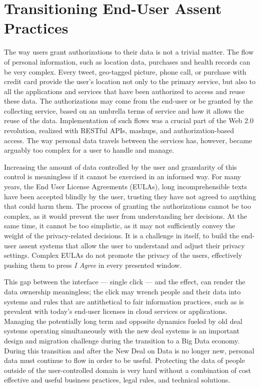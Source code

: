 \section{Transitioning End-User Assent Practices }

The way users grant authorizations to their data is not a trivial matter.
The flow of personal information, such as location data, purchases and health records can be very complex.
Every tweet, geo-tagged picture, phone call, or purchase with credit card provide the user's location not only to the primary service, but also to all the applications and services that have been authorized to access and reuse these data.
The authorizations may come from the end-user or be granted by the collecting service, based on an umbrella terms of service and how it allows the reuse of the data.
Implementation of such flows was a crucial part of the Web 2.0 revolution, realized with RESTful APIs, mashups, and authorization-based access.
The way personal data travels between the services has, however, became arguably too complex for a user to handle and manage.

Increasing the amount of data controlled by the user and granularity of this control is meaningless if it cannot be exercised in an informed way.
For many years, the End User License Agreements (EULAs), long incomprehensible texts have been accepted blindly by the user, trusting they have not agreed to anything that could harm them.
The process of granting the authorizations cannot be too complex, as it would prevent the user from understanding her decisions.
At the same time, it cannot be too simplistic, as it may not sufficiently convey the weight of the privacy-related decisions.
It is a challenge in itself, to build the end-user assent systems that allow the user to understand and adjust their privacy settings.
Complex EULAs do not promote the privacy of the users, effectively pushing them to press \emph{I Agree} in every presented window. 

This gap between the interface --- single click --- and the effect, can render the data ownership meaningless; the click may wrench people and their data into systems and rules that are antithetical to fair information practices, such as is prevalent with today's end-user licenses in cloud services or applications.
Managing the potentially long term and opposite dynamics fueled by old deal systems operating simultaneously with the new deal systems is an important design and migration challenge during the transition to a Big Data economy.
During this transition and after the New Deal on Data is no longer new, personal data must continue to flow in order to be useful.
Protecting the data of people outside of the user-controlled domain is very hard without a combination of cost effective and useful business practices, legal rules, and technical solutions.

